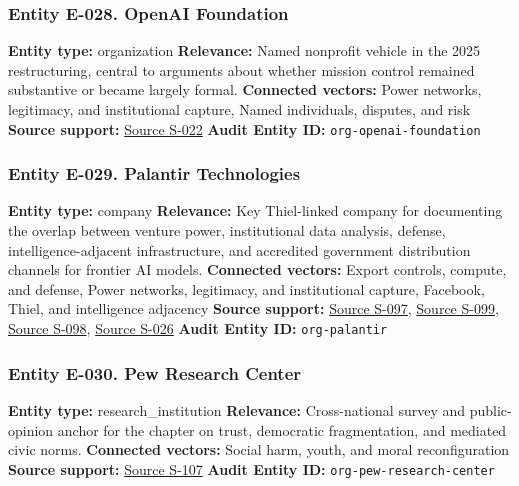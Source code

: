 \documentclass[
  american,
  11pt,
  letterpaper,
]{article}
\begin{document}
\subsubsection{Entity E-028. OpenAI
Foundation}\label{entity-e-028-openai-foundation}

\textbf{Entity type:} organization \textbf{Relevance:} Named nonprofit
vehicle in the 2025 restructuring, central to arguments about whether
mission control remained substantive or became largely formal.
\textbf{Connected vectors:} Power networks, legitimacy, and
institutional capture, Named individuals, disputes, and risk
\textbf{Source support:}
\hyperref[source-s-022-openai-may-move-forward-with-new-business-structure-partnership-with-microsoft-regulators-say]{Source
S-022} \textbf{Audit Entity ID:} \texttt{org-openai-foundation}

\subsubsection{Entity E-029. Palantir
Technologies}\label{entity-e-029-palantir-technologies}

\textbf{Entity type:} company \textbf{Relevance:} Key Thiel-linked
company for documenting the overlap between venture power, institutional
data analysis, defense, intelligence-adjacent infrastructure, and
accredited government distribution channels for frontier AI models.
\textbf{Connected vectors:} Export controls, compute, and defense, Power
networks, legitimacy, and institutional capture, Facebook, Thiel, and
intelligence adjacency \textbf{Source support:}
\hyperref[source-s-097-about-palantir]{Source S-097},
\hyperref[source-s-099-gotham]{Source S-099},
\hyperref[source-s-098-anthropic-and-palantir-partner-to-bring-claude-ai-models-to-aws-for-u-s-government-intelligence-and-defense-operations]{Source
S-098},
\hyperref[source-s-026-army-launches-detachment-201-executive-innovation-corps-to-drive-tech-transformation]{Source
S-026} \textbf{Audit Entity ID:} \texttt{org-palantir}

\subsubsection{Entity E-030. Pew Research
Center}\label{entity-e-030-pew-research-center}

\textbf{Entity type:} research\_institution \textbf{Relevance:}
Cross-national survey and public-opinion anchor for the chapter on
trust, democratic fragmentation, and mediated civic norms.
\textbf{Connected vectors:} Social harm, youth, and moral
reconfiguration \textbf{Source support:}
\hyperref[source-s-107-social-media-seen-as-mostly-good-for-democracy-across-many-nations-but-u-s-is-a-major-outlier]{Source
S-107} \textbf{Audit Entity ID:} \texttt{org-pew-research-center}
\end{document}
